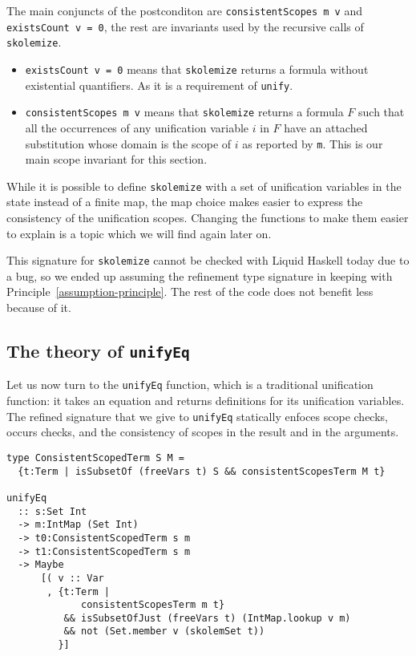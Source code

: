 \documentclass[sigconf]{acmart}
\newcommand{\tc}[1]{{\small\texttt{#1}}}
\begin{document}
The main conjuncts of the postconditon are \tc{consistent\-Scopes m v} and
\tc{existsCount v = 0}, the rest are invariants used by the recursive calls of
\tc{skolemize}.
\begin{itemize}
  \item \tc{existsCount v = 0} means that \tc{skolemize} returns a formula without
  existential quantifiers. As it is a requirement of \tc{unify}.
  \item \tc{consistentScopes m v} means that \tc{skolemize} returns a
  formula $F$ such that all the occurrences of any unification variable $i$ in $F$
  have an attached substitution whose domain is the scope of $i$ as reported by \tc{m}. This is our main scope invariant for this
  section.
\end{itemize}

While it is possible to define \tc{skolemize} with a set of unification variables
in the state instead of a finite map, the map choice makes easier to express the
consistency of the unification scopes. Changing the functions to make them easier
to explain is a topic which we will find again later on.

This signature for \tc{skolemize} cannot be checked with Liquid Haskell today
due to
a bug, so we ended up assuming the refinement type signature
in keeping with Principle~\ref{assumption-principle}. The rest
of the code does not benefit less because of it.

\subsection{The theory of \tc{unifyEq}}
\label{checking-unifyEq}

Let us now turn to the \tc{unifyEq} function, which is a traditional unification
function: it takes an equation and returns definitions for its unification
variables.
The refined signature that we give to \tc{unifyEq} statically enfoces scope checks, occurs checks,
and the consistency of scopes in the result and in the arguments.

\begin{verbatim}
type ConsistentScopedTerm S M =
  {t:Term | isSubsetOf (freeVars t) S && consistentScopesTerm M t}

unifyEq
  :: s:Set Int
  -> m:IntMap (Set Int)
  -> t0:ConsistentScopedTerm s m
  -> t1:ConsistentScopedTerm s m
  -> Maybe
      [( v :: Var
       , {t:Term |
             consistentScopesTerm m t}
          && isSubsetOfJust (freeVars t) (IntMap.lookup v m)
          && not (Set.member v (skolemSet t))
         }]
\end{verbatim}
\end{document}
